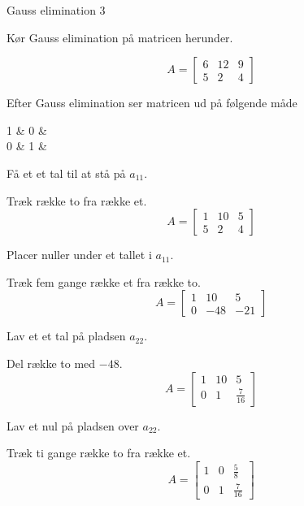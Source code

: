 \documentclass{article}
\begin{document}
\begin{exercise}{Gauss elimination 3}
	
	
	Kør Gauss elimination på matricen herunder.
	
	\[
	A = \left[\begin{array}{rr|r}
	6 & 12 & 9 \\ 
	5 & 2 & 4
	\end{array} \right]
	\]
	
	Efter Gauss elimination ser matricen ud på følgende måde
	\begin{answermatrix}
		1 & 0 &  \\
		0 & 1 & 
	\end{answermatrix}
	
	\hint
	Få et et tal til at stå på $a_{11}$.
	
	\hint
	Træk række to fra række et.
	\[
	A = \left[\begin{array}{rr|r}
	1 & 10 & 5 \\ 
	5 & 2 & 4
	\end{array} \right]
	\]
	
	\hint
	Placer nuller under et tallet i $a_{11}$.
	
	\hint
	Træk fem gange række et fra række to.
	\[
	A = \left[\begin{array}{rr|r}
	1 & 10 & 5 \\ 
	0 & -48 & -21
	\end{array} \right]
	\]
	
	\hint
	Lav et et tal på pladsen $a_{22}$.
	
	\hint
	Del række to med $-48$.
	\[
	A = \left[\begin{array}{rr|r}
	1 & 10 & 5 \\ 
	0 & 1 & \frac{7}{16}
	\end{array} \right]
	\]
	
	
	\hint
	Lav et nul på pladsen over $a_{22}$.
	
	\hint
	Træk ti gange række to fra række et.
	\[
	A = \left[\begin{array}{rr|r}
	1 & 0 & \frac{5}{8} \\ 
	0 & 1 & \frac{7}{16}
	\end{array} \right]
	\]
	
	
\end{exercise}

\newpage
\end{document}
